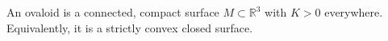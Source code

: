 An ovaloid is a connected, compact surface $M \subset \mathbb{R}^3$ with $K > 0$ everywhere. Equivalently, it is a strictly convex closed surface.